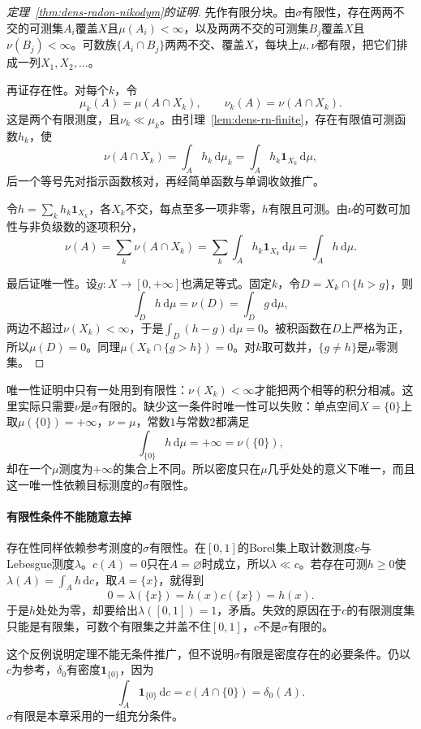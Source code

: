 \begin{proof}[定理~\ref{thm:dens-radon-nikodym}的证明]
先作有限分块。由$\sigma$有限性，存在两两不交的可测集$A_i$覆盖$X$且$\mu(A_i)<\infty$，以及两两不交的可测集$B_j$覆盖$X$且$\nu(B_j)<\infty$。可数族$\{A_i\cap B_j\}$两两不交、覆盖$X$，每块上$\mu,\nu$都有限，把它们排成一列$X_1,X_2,\ldots$。

再证存在性。对每个$k$，令
\[
\mu_k(A)=\mu(A\cap X_k),\qquad\nu_k(A)=\nu(A\cap X_k).
\]
这是两个有限测度，且$\nu_k\ll\mu_k$。由引理~\ref{lem:dens-rn-finite}，存在有限值可测函数$h_k$，使
\[
\nu(A\cap X_k)=\int_Ah_k\,\mathrm d\mu_k=\int_Ah_k\mathbf 1_{X_k}\,\mathrm d\mu ,
\]
后一个等号先对指示函数核对，再经简单函数与单调收敛推广。

令$h=\sum_kh_k\mathbf 1_{X_k}$，各$X_k$不交，每点至多一项非零，$h$有限且可测。由$\nu$的可数可加性与非负级数的逐项积分，
\[
\nu(A)=\sum_k\nu(A\cap X_k)=\sum_k\int_Ah_k\mathbf 1_{X_k}\,\mathrm d\mu=\int_Ah\,\mathrm d\mu .
\]

最后证唯一性。设$g:X\to[0,+\infty]$也满足等式。固定$k$，令$D=X_k\cap\{h>g\}$，则
\[
\int_Dh\,\mathrm d\mu=\nu(D)=\int_Dg\,\mathrm d\mu ,
\]
两边不超过$\nu(X_k)<\infty$，于是$\int_D(h-g)\,\mathrm d\mu=0$。被积函数在$D$上严格为正，所以$\mu(D)=0$。同理$\mu(X_k\cap\{g>h\})=0$。对$k$取可数并，$\{g\neq h\}$是$\mu$零测集。
\end{proof}

唯一性证明中只有一处用到有限性：$\nu(X_k)<\infty$才能把两个相等的积分相减。这里实际只需要$\nu$是$\sigma$有限的。缺少这一条件时唯一性可以失败：单点空间$X=\{0\}$上取$\mu(\{0\})=+\infty$，$\nu=\mu$，常数$1$与常数$2$都满足
\[
\int_{\{0\}}h\,\mathrm d\mu=+\infty=\nu(\{0\}),
\]
却在一个$\mu$测度为$+\infty$的集合上不同。所以密度只在$\mu$几乎处处的意义下唯一，而且这一唯一性依赖目标测度的$\sigma$有限性。

\paragraph{有限性条件不能随意去掉}
存在性同样依赖参考测度的$\sigma$有限性。在$[0,1]$的Borel集上取计数测度$c$与Lebesgue测度$\lambda$。$c(A)=0$只在$A=\varnothing$时成立，所以$\lambda\ll c$。若存在可测$h\geq0$使$\lambda(A)=\int_Ah\,\mathrm dc$，取$A=\{x\}$，就得到
\[
0=\lambda(\{x\})=h(x)c(\{x\})=h(x).
\]
于是$h$处处为零，却要给出$\lambda([0,1])=1$，矛盾。失效的原因在于$c$的有限测度集只能是有限集，可数个有限集之并盖不住$[0,1]$，$c$不是$\sigma$有限的。

这个反例说明定理不能无条件推广，但不说明$\sigma$有限是密度存在的必要条件。仍以$c$为参考，$\delta_0$有密度$\mathbf 1_{\{0\}}$，因为
\[
\int_A\mathbf 1_{\{0\}}\,\mathrm dc=c(A\cap\{0\})=\delta_0(A).
\]
$\sigma$有限是本章采用的一组充分条件。

